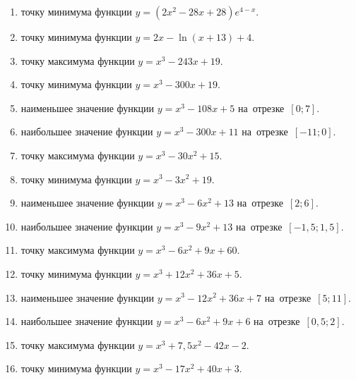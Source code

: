 \documentclass[a4paper,10pt]{article}
\begin{document}
\begin{enumerate}
\item {} точку минимума функции $y=\left(2x^2-28x+28\right){{e}^{4-x}}$.

\item {} точку минимума функции $y=2x-\ln \left(x+13\right)+4$.

\item {} точку максимума функции $y=x^3 -243x +19$.

\item {} точку минимума функции $y=x^3 -300x+19$.

\item {} наименьшее значение функции $y=x^3 -108x+5$ на~отрезке~$\left[0;7\right]$.

\item {} наибольшее значение функции $y=x^3 -300x+11$ на~отрезке~$\left[-11;0\right]$.

\item {} точку максимума функции $y=x^3 -30x^2+15$.

\item {} точку минимума функции $y=x^3 -3x^2+19$.

\item {} наименьшее значение функции $y=x^3 -6x^2+13$ на~отрезке~$\left[2;6\right]$.

\item {} наибольшее значение функции $y=x^3 -9x^2+13$ на~отрезке~$\left[-1,5;1,5\right]$.

\item {} точку максимума функции $y=x^3 -6x^2+9x+60$.

\item {} точку минимума функции $y=x^3 +12x^2+36x+5$.

\item {} наименьшее значение функции $y=x^3 -12x^2+36x+7$ на~отрезке~$\left[5;11\right]$.

\item {} наибольшее значение функции $y=x^3 -6x^2+9x+6$ на~отрезке~$\left[0,5;2\right]$.

\item {} точку максимума функции $y=x^3 +7,5x^2-42x-2$.

\item {} точку минимума функции $y=x^3 -17x^2+40x+3$.


\end{enumerate}
\end{document}
